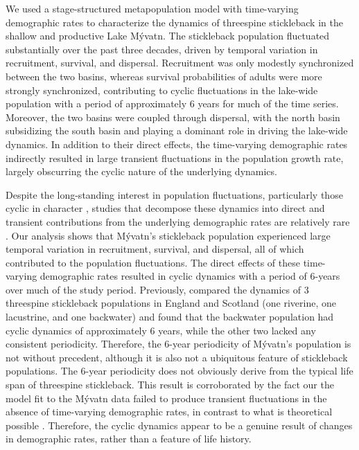 \documentclass[11pt]{article}
\begin{document}
We used a stage-structured metapopulation model 
with time-varying demographic rates to characterize the 
dynamics of threespine stickleback in the shallow and productive Lake M\'{y}vatn.
The stickleback population fluctuated substantially over the past three decades,
driven by  temporal variation in recruitment, survival, and dispersal.
Recruitment was only modestly synchronized between the two basins, 
whereas survival probabilities of adults were more strongly synchronized, 
contributing to cyclic fluctuations in the lake-wide population 
with a period of approximately 6 years for much of the time series. 
Moreover, the two basins were coupled through dispersal, 
with the north basin subsidizing the south basin and playing a dominant role 
in driving the lake-wide dynamics. 
In addition to their direct effects, the time-varying demographic rates 
indirectly resulted in large transient fluctuations in the population growth rate,
largely obscurring the cyclic nature of the underlying dynamics.





Despite the long-standing interest in population fluctuations,
particularly those cyclic in character 
\citep{elton1924, nicholson1935},
studies that decompose these dynamics into direct and transient contributions 
from the underlying demographic rates are relatively rare 
\citep{fox2000population, koons2017understanding, hoy2020fluctuations}.
Our analysis shows that M\'{y}vatn's stickleback population experienced
large temporal variation in recruitment, survival, and dispersal, 
all of which contributed to the population fluctuations. 
The direct effects of these time-varying demographic rates resulted in 
cyclic dynamics with a period of 6-years over much of the study period.
Previously,
\cite{wootton2005} compared the dynamics of 3 threespine stickleback populations 
in England and Scotland (one riverine, one lacustrine, and one backwater)
and found that the backwater population had cyclic dynamics of approximately
6 years, while the other two lacked any consistent periodicity.
Therefore, the 6-year periodicity of M\'{y}vatn's population is not without precedent,
although it is also not a ubiquitous feature of stickleback populations.
The 6-year periodicity does not obviously derive from the typical life span 
of threespine stickleback.
This result is corroborated by the fact our the model fit to the M\'{y}vatn data
failed to produce transient fluctuations in the absence of time-varying demographic rates,
in contrast to what is theoretical possible \citep{caswell2001, tenhumberg2009}.
Therefore, the cyclic dynamics appear to be a genuine result of changes in demographic rates,
rather than a feature of life history.
\end{document}
